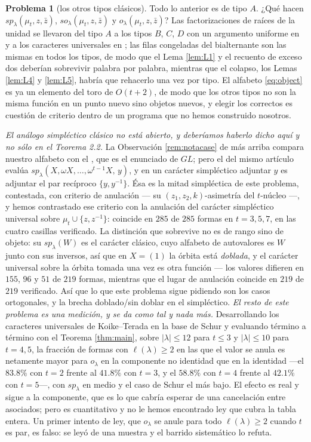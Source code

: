 \documentclass[11pt,reqno]{amsart}
\newcommand{\stverif}{\textcolor{hverif}{\small verificado}}
\theoremstyle{plain}
\theoremstyle{definition}
\newtheorem{problem}[theorem]{Problema}
\newcommand{\zt}{\mu_t}
\newcommand{\zb}{\bar z}
\begin{document}
\begin{problem}[los otros tipos clásicos]\label{prob:types}
Todo lo anterior es de tipo $A$. ¿Qué hacen $sp_\lambda(\zt,z,\zb)$, $so_\lambda(\zt,z,\zb)$ y
$o_\lambda(\zt,z,\zb)$? Las factorizaciones de raíces de la unidad se llevaron del tipo $A$ a los
tipos $B$, $C$, $D$ con un argumento uniforme en \cite{AK22} y a los caracteres universales en
\cite{Alb23}; las filas congeladas del bialternante son las mismas en todos los tipos, de modo que el
Lema \ref{lem:L1} y el recuento de exceso dos deberían sobrevivir palabra por palabra, mientras que
el colapso, los Lemas \ref{lem:L4} y \ref{lem:L5}, habría que rehacerlo una vez por tipo. El alfabeto
\eqref{eq:object} es ya un elemento del toro de $O(t+2)$, de modo que los otros tipos no son la misma
función en un punto nuevo sino objetos nuevos, y elegir los correctos es cuestión de criterio dentro
de un programa que no hemos construido nosotros.

\emph{El análogo simpléctico clásico no está abierto, y deberíamos haberlo dicho aquí y no sólo
en el Teorema 2.2.} La Observación \ref{rem:notacase} de más arriba compara nuestro alfabeto con el
\cite[Teorema 2.2]{Kum24}, que es el enunciado de $GL$; pero el \cite[Teorema 2.8]{Kum24} del
mismo artículo evalúa $sp_\lambda(X,\omega X,\dots,\omega^{t-1}X,\,y)$, y en un carácter
simpléctico adjuntar $y$ es adjuntar el par recíproco $\{y,y^{-1}\}$. Ésa es la mitad simpléctica
de este problema, contestada, con criterio de anulación --- su $(z_1,z_2,k)$-asimetría del
$t$-núcleo ---, y hemos contrastado ese criterio con la anulación del carácter simpléctico
universal sobre $\mu_t\cup\{z,z^{-1}\}$: coincide en $285$ de $285$ formas en $t=3,5,7$, en las
cuatro casillas \stverif. La distinción que sobrevive no es de rango sino de objeto: su
$sp_\lambda(W)$ es el carácter clásico, cuyo alfabeto de autovalores es $W$ junto con sus
inversos, así que en $X=(1)$ la órbita está \emph{doblada}, y el carácter universal sobre la
órbita tomada una vez es otra función --- los valores difieren en $155$, $96$ y $51$ de $219$
formas, mientras que el lugar de anulación coincide en $219$ de $219$ \stverif. Así que lo que
este problema sigue pidiendo son los casos ortogonales, y la brecha doblado/sin doblar en el
simpléctico. \emph{El resto de este problema es una medición, y se da como tal y nada más.} Desarrollando los caracteres universales de Koike--Terada en la base de Schur y evaluando
término a término con el Teorema \ref{thm:main}, sobre $|\lambda|\le12$ para $t\le3$ y
$|\lambda|\le10$ para $t=4,5$, la fracción de formas con $\ell(\lambda)\ge2$ en las que el valor se
anula es netamente mayor para $o_\lambda$ en la componente no identidad que en la identidad ---el
$83.8\%$ con $t=2$ frente al $41.8\%$ con $t=3$, y el $58.8\%$ con $t=4$ frente al $42.1\%$ con
$t=5$---, con $sp_\lambda$ en medio y el caso de Schur el más bajo. El efecto es real y sigue a la
componente, que es lo que cabría esperar de una cancelación entre asociados; pero es cuantitativo y
no le hemos encontrado ley que cubra la tabla entera. Un primer intento de ley, que $o_\lambda$ se
anule para todo
$\ell(\lambda)\ge2$ cuando $t$ es par, es falso: se leyó de una muestra y el barrido sistemático lo
refuta.


\end{problem}
\end{document}
